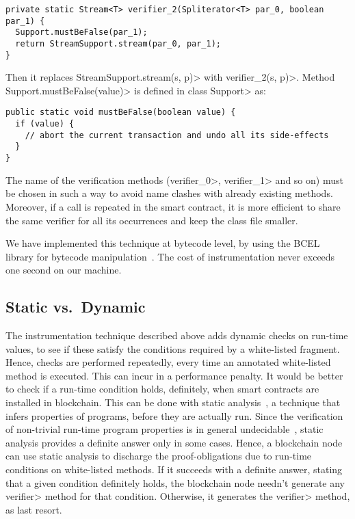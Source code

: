 {\small\begin{verbatim}
private static Stream<T> verifier_2(Spliterator<T> par_0, boolean par_1) {
  Support.mustBeFalse(par_1);
  return StreamSupport.stream(par_0, par_1);
}
\end{verbatim}}

\noindent
Then it replaces \<StreamSupport.stream(s, p)> with \<verifier\_2(s, p)>.
Method \<Support.mustBeFalse(value)> is defined in class \<Support> as:

{\small\begin{verbatim}
public static void mustBeFalse(boolean value) {
  if (value) {
    // abort the current transaction and undo all its side-effects
  }
}
\end{verbatim}}

The name of the verification methods (\<verifier\_0>, \<verifier\_1> and so on)
must be chosen in such a way to avoid name clashes with already existing methods.
Moreover, if a call is repeated
in the smart contract, it is more efficient to share the same verifier for all
its occurrences and keep the class file smaller.

We have implemented this technique at bytecode level, by using the BCEL
library for bytecode manipulation~\cite{bcel}. The cost of instrumentation never exceeds one
second on our machine.

\subsection{Static vs.\ Dynamic}\label{subsec:static_vs_dynamic}

The instrumentation technique described above adds dynamic checks on run-time values, to see
if these satisfy the conditions required by a white-listed fragment.
Hence, checks are performed repeatedly, every time an annotated white-listed method
is executed. This can incur in a performance penalty. It would be better
to check if a run-time condition holds, definitely, when smart contracts are installed
in blockchain.
This can be done with static analysis~\cite{NielsonNH99}, a technique that infers
properties of programs, before they are actually run. Since the verification of
non-trivial run-time program properties is in general undecidable~\cite{Rice53},
static analysis provides a definite answer
only in some cases. Hence, a blockchain node can use static analysis to discharge
the proof-obligations due to run-time conditions on white-listed methods. If it
succeeds with a definite answer, stating that a given condition definitely holds,
the blockchain node needn't generate any \<verifier> method for that condition. Otherwise, it
generates the \<verifier> method, as last resort.

